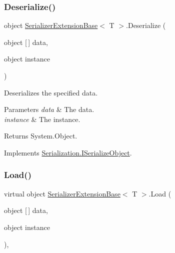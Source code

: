 \subsubsection{\texorpdfstring{Deserialize()}{Deserialize()}}
{\footnotesize\ttfamily object \hyperlink{class_serializer_extension_base}{Serializer\+Extension\+Base}$<$ T $>$.Deserialize (\begin{DoxyParamCaption}\item[{object \mbox{[}$\,$\mbox{]}}]{data,  }\item[{object}]{instance }\end{DoxyParamCaption})\hspace{0.3cm}{\ttfamily [inline]}}



Deserializes the specified data. 


\begin{DoxyParams}{Parameters}
{\em data} & The data.\\
\hline
{\em instance} & The instance.\\
\hline
\end{DoxyParams}
\begin{DoxyReturn}{Returns}
System.\+Object.
\end{DoxyReturn}


Implements \hyperlink{interface_serialization_1_1_i_serialize_object_a100975fc581fdc4e4d29759daef4b99e}{Serialization.\+I\+Serialize\+Object}.

\mbox{\label{class_serializer_extension_base_a3792a9b27056e30ca0ac91531936ae47}} 
\subsubsection{\texorpdfstring{Load()}{Load()}}
{\footnotesize\ttfamily virtual object \hyperlink{class_serializer_extension_base}{Serializer\+Extension\+Base}$<$ T $>$.Load (\begin{DoxyParamCaption}\item[{object \mbox{[}$\,$\mbox{]}}]{data,  }\item[{object}]{instance }\end{DoxyParamCaption})\hspace{0.3cm}{\ttfamily [inline]}, {\ttfamily [virtual]}}



